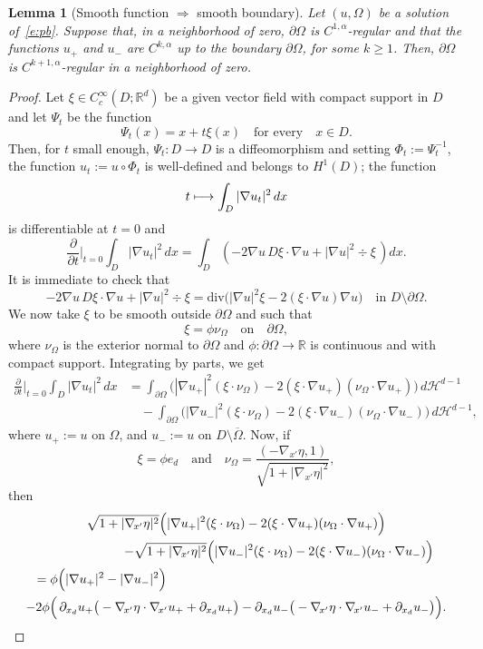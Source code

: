 \documentclass[JEP,XML,SOM,Unicode]{cedram}
\def\mto{\mathchoice{\longmapsto}{\mapsto}{\mapsto}{\mapsto}}
\theoremstyle{plain}
\newtheorem{lemma}[teo]{Lemma}
\theoremstyle{definition}
\let\ds\displaystyle
\def\R{\mathbb{R}}
\def\HH{\mathcal{H}}
\begin{document}
\begin{lemma}[Smooth function $\Rightarrow$ smooth boundary] \label{l:reg2}
Let $(u,\Omega)$ be a solution of~\eqref{e:pb}. Suppose that, in a neighborhood of zero, $\partial\Omega$ is $C^{1,\alpha}$-regular and that the functions $u_+$ and $u_-$ are $C^{k,\alpha}$ up to the boundary $\partial\Omega$, for some $k\ge 1$. Then, $\partial\Omega$ is $C^{k+1,\alpha}$-regular in a neighborhood of zero.
\end{lemma}
\begin{proof}
Let $\xi\in C^\infty_c(D ;\R^d)$ be a given vector field with compact support in $D$ and let $\Psi_t$ be the function
\[\Psi_t(x)=x+t\xi (x)\quad\text{for every}\quad x\in D.\]
Then, for $t$ small enough, $\Psi_t: D\to D$ is a diffeomorphism and setting $\Phi_t:=\Psi_t^{-1}$, the function $u_t:=u\circ \Phi_t$ is well-defined and belongs to $H^1(D)$; the function
\[
\ds t\mto\int_{D}|\nabla u_t|^2\,dx
\]
is differentiable at $t=0$ and
\[\frac{\partial}{\partial t}\Big\vert_{t=0}\int_{D}|\nabla u_t|^2\,dx= \int_{D}\left(-2\nabla u\, D\xi\cdot \nabla u+ |\nabla u|^2\div\xi\,\right)dx.\]
It is immediate to check that
\[-2\nabla u\, D\xi\cdot \nabla u+ |\nabla u|^2\div\xi = \text{div}\big(|\nabla u|^2\xi-2(\xi\cdot\nabla u)\nabla u\big)\quad\text{in } D\setminus\partial\Omega.\]
We now take $\xi$ to be smooth outside $\partial \Omega$ and such that
\[\xi=\phi \nu_\Omega\quad\text{on}\quad \partial\Omega,\]
where $\nu_\Omega$ is the exterior normal to
$\partial\Omega$ and $\phi:\partial\Omega\to\R$ is continuous and with compact support. Integrating by parts, we get
\begin{align*}
\frac{\partial}{\partial t}\Big\vert_{t=0}\int_{D}|\nabla u_t|^2\,dx&=\int_{\partial\Omega}\Big(|\nabla u_+|^2(\xi\cdot\nu_\Omega)-2(\xi\cdot\nabla u_+)(\nu_\Omega\cdot\nabla u_+)\Big)\,d\HH^{d-1}\\
&\quad-\int_{\partial\Omega}\Big(|\nabla u_-|^2(\xi\cdot\nu_\Omega)-2(\xi\cdot\nabla u_-)(\nu_\Omega\cdot\nabla u_-)\Big)\,d\HH^{d-1},
\end{align*}
where $u_+:=u$ on $\Omega$, and $u_-:=u$ on $D\setminus\overline \Omega$. Now, if
\[\xi=\phi e_d\quad\text{and}\quad\nu_\Omega=\frac{(-\nabla_{\!x'}\eta,1)}{\sqrt{1+|\nabla_{\!x'}\eta|^2}},\]
then
\begin{multline*}
\sqrt{1+|\nabla_{\!x'}\eta|^2}\Big(|\nabla u_+|^2(\xi\cdot\nu_\Omega)-2(\xi\cdot\nabla u_+)(\nu_\Omega\cdot\nabla u_+)\Big)\\
\shoveright{-\sqrt{1+|\nabla_{\!x'}\eta|^2}\Big(|\nabla u_-|^2(\xi\cdot\nu_\Omega)-2(\xi\cdot\nabla u_-)(\nu_\Omega\cdot\nabla u_-)\Big)}\\
\shoveleft{=\phi\Big(|\nabla u_+|^2-|\nabla u_-|^2\Big)}\\
-2\phi\Big(\,\partial_{x_d}u_+\big(-\nabla_{\!x'}\eta\cdot\nabla_{\!x'}u_++\partial_{x_d}u_+\big)-\partial_{x_d}u_-\big(-\nabla_{\!x'}\eta\cdot\nabla_{\!x'}u_-+\partial_{x_d}u_-\big)\Big).
\end{multline*}


\end{proof}
\end{document}
